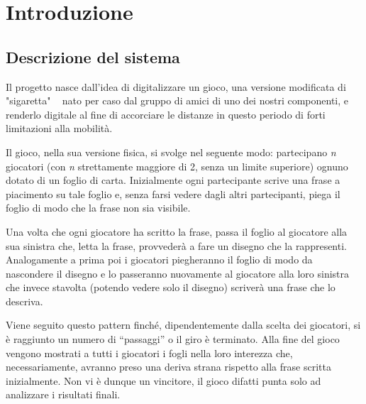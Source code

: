 \chapter{Introduzione}
\section{Descrizione del sistema}
\noindent Il progetto nasce dall’idea di digitalizzare un gioco, una versione modificata di "sigaretta" ~\cite{wiki:Sigarettagioco} nato per caso dal gruppo di amici di uno dei nostri componenti, e renderlo digitale al fine di accorciare le distanze in questo periodo di forti limitazioni alla mobilità.\newline

\noindent Il gioco, nella sua versione fisica, si svolge nel seguente modo: partecipano \textit{n} giocatori (con \textit{n} strettamente maggiore di 2, senza un limite superiore) ognuno dotato di un foglio di carta. Inizialmente ogni partecipante scrive una frase a piacimento su tale foglio e, senza farsi vedere dagli altri partecipanti, piega il foglio di modo che la frase non sia visibile.\newline

\noindent Una volta che ogni giocatore ha scritto la frase, passa il foglio al giocatore alla sua sinistra che, letta la frase, provvederà a fare un disegno che la rappresenti. Analogamente a prima poi i giocatori piegheranno il foglio di modo da nascondere il disegno e lo passeranno nuovamente al giocatore alla loro sinistra che invece stavolta (potendo vedere solo il disegno) scriverà una frase che lo descriva.\newline

\noindent Viene seguito questo pattern finché, dipendentemente dalla scelta dei giocatori, si è raggiunto un numero di “passaggi” o il giro è terminato. Alla fine del gioco vengono mostrati a tutti i giocatori i fogli nella loro interezza che, necessariamente, avranno preso una deriva strana rispetto alla frase scritta inizialmente. Non vi è dunque un vincitore, il gioco difatti punta solo ad analizzare i risultati finali.
